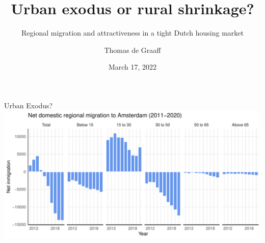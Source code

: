 \documentclass{beamer}
\title{Urban exodus or rural shrinkage?}
\subtitle{Regional migration and attractiveness in a tight Dutch housing market}
\date{March 17, 2022}
\author{Thomas de Graaff}
\institute{Vrije Universiteit Amsterdam\\Tinbergen Institute Amsterdam}
\begin{document}
\maketitle

\begin{frame}{Urban Exodus?}
	\includegraphics[width=1\textwidth]{../../fig/outmig_amsterdam.pdf}
\end{frame}
\end{document}
